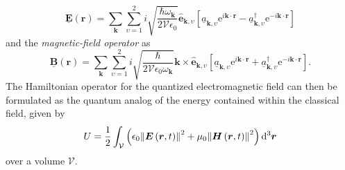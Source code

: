 \begin{equation}\label{eq:E-field_operator_fixed_linear}
 \underline{\mathbold{E}} ( \mathbold{r} ) = \sum_{\mathbold{k}} \sum_{\upsilon = 1}^2  i \sqrt{\frac{\hbar \omega_{\mathbold{k}}}{2 \mathcal{V} \epsilon_0}} \hat{\mathbold{e}}_{\mathbold{k},\upsilon} \left[ \underline{a}_{\mathbold{k},\upsilon} \mathrm{e}^{i \mathbold{k} \cdot \mathbold{r} } - \underline{a}^{\dagger}_{\mathbold{k},\upsilon} \mathrm{e}^{-i \mathbold{k} \cdot \mathbold{r}} \right] 
 \end{equation}
and the \emph{magnetic-field operator} as
\begin{equation}\label{eq:B-field_operator_fixed_linear}
 \underline{\mathbold{B}} ( \mathbold{r} ) = \sum_{\mathbold{k}} \sum_{\upsilon = 1}^2 i \sqrt{\frac{\hbar}{2 \mathcal{V} \epsilon_0 \omega_{\mathbold{k}}}} \mathbold{k} \times \hat{\mathbold{e}}_{\mathbold{k},\upsilon} \left[ \underline{a}_{\mathbold{k},\upsilon} \mathrm{e}^{i \mathbold{k} \cdot \mathbold{r} } + \underline{a}^{\dagger}_{\mathbold{k},\upsilon} \mathrm{e}^{-i \mathbold{k} \cdot \mathbold{r} } \right] .
 \end{equation} 
The Hamiltonian operator for the quantized electromagnetic field can then be formulated as the quantum analog of the energy contained within the classical field, given by 
\begin{equation}\label{eq:EM_energy_density}
 U = \frac{1}{2} \int_{\mathcal{V}} \left( \epsilon_0 \norm{\mathbold{E} \left( \mathbold{r} , t \right)}^2 + \mu_0 \norm{\mathbold{H} \left( \mathbold{r} , t \right)}^2  \right) \dd[3]{\mathbold{r}} 
 \end{equation}
over a volume $\mathcal{V}$. 

